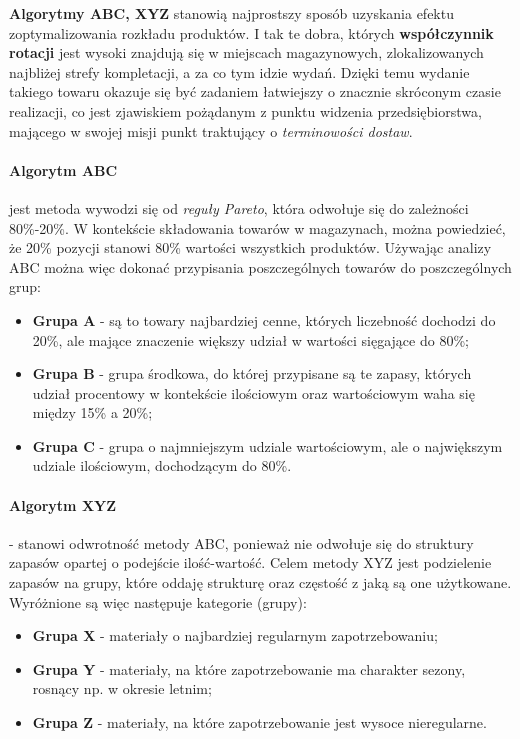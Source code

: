 		\textbf{Algorytmy ABC, XYZ} stanowią najprostszy sposób uzyskania efektu zoptymalizowania rozkładu produktów. I tak
		te dobra, których \textbf{współczynnik rotacji} jest wysoki znajdują się w miejscach magazynowych, zlokalizowanych
		najbliżej strefy kompletacji, a za co tym idzie wydań. Dzięki temu wydanie takiego towaru okazuje się być
		zadaniem łatwiejszy o znacznie skróconym czasie realizacji, co jest zjawiskiem pożądanym z punktu widzenia przedsiębiorstwa,
		mającego w swojej misji punkt traktujący o \textit{terminowości dostaw}. 
			\paragraph{Algorytm ABC} jest metoda wywodzi się od \textit{reguły Pareto}, 
			która odwołuje się do zależności 80\%-20\%. W kontekście składowania towarów 
			w magazynach, można powiedzieć, że 20\% pozycji stanowi 80\% wartości
			wszystkich produktów. Używając analizy ABC można więc dokonać przypisania 
			poszczególnych towarów do poszczególnych grup:
			\begin{itemize}
				\item \textbf{Grupa A} - są to towary najbardziej cenne, których liczebność
				dochodzi do 20\%, ale mające znaczenie większy udział w wartości sięgające
				do 80\%;
				\item \textbf{Grupa B} - grupa środkowa, do której przypisane są te zapasy, których
				udział procentowy w kontekście ilościowym oraz wartościowym waha się między 15\% a 20\%;
				\item \textbf{Grupa C} - grupa o najmniejszym udziale wartościowym, ale o największym udziale
				ilościowym, dochodzącym do 80\%.
			\end{itemize}
			
			\paragraph{Algorytm XYZ} - stanowi odwrotność metody ABC, ponieważ nie odwołuje się
			do struktury zapasów opartej o podejście ilość-wartość. Celem metody XYZ jest podzielenie
			zapasów na grupy, które oddaję strukturę oraz częstość z jaką są one użytkowane. Wyróżnione
			są więc następuje kategorie (grupy):
			\begin{itemize}
				\item \textbf{Grupa X} - materiały o najbardziej regularnym zapotrzebowaniu;
				\item \textbf{Grupa Y} - materiały, na które zapotrzebowanie ma charakter sezony, rosnący
				np. w okresie letnim;
				\item \textbf{Grupa Z} - materiały, na które zapotrzebowanie jest wysoce nieregularne.
			\end{itemize}			 
			

